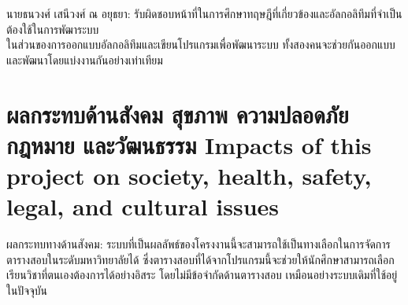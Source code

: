 \noindent นายธนวงศ์ เสนีวงศ์ ณ อยุธยา: รับผิดชอบหน้าที่ในการศึกษาทฤษฎีที่เกี่ยวข้องและอัลกอลิทึมที่จำเป็นต้องใช้ในการพัฒาระบบ \\


\noindent ในส่วนของการออกแบบอัลกอลิทึมและเขียนโปรแกรมเพื่อพัฒนาระบบ ทั้งสองคนจะช่วยกันออกแบบและพัฒนาโดยแบ่งงานกันอย่างเท่าเทียม

\section{\ifcpe%
ผลกระทบด้านสังคม สุขภาพ ความปลอดภัย กฎหมาย และวัฒนธรรม
\else%
Impacts of this project on society, health, safety, legal, and cultural issues
\fi}

ผลกระทบทางด้านสังคม: ระบบที่เป็นผลลัพธ์ของโครงงานนี้จะสามารถใช้เป็นทางเลือกในการจัดการตารางสอบในระดับมหาวิทยาลัยได้
ซึ่งตารางสอบที่ได้จากโปรแกรมนี้จะช่วยให้นักศึกษาสามารถเลือกเรียนวิชาที่ตนเองต้องการได้อย่างอิสระ โดยไม่มีข้อจำกัดด้านตารางสอบ
เหมือนอย่างระบบเดิมที่ใช้อยู่ในปัจจุบัน